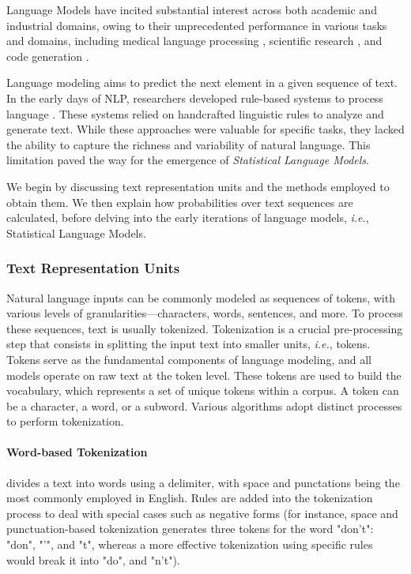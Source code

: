 Language Models have incited substantial interest across both academic and industrial domains, owing to their unprecedented performance in various tasks and domains, including medical language processing \citep{thirunavukarasu2023large}, scientific research \citep{wang2023scientific}, and code generation \citep{xu2022systematic}.

Language modeling aims to predict the next element in a given sequence of text. In the early days of \ac{NLP}, researchers developed rule-based systems to process language \citep{manning1999foundations}. These systems relied on handcrafted linguistic rules to analyze and generate text. While these approaches were valuable for specific tasks, they lacked the ability to capture the richness and variability of natural language. This limitation paved the way for the emergence of \textit{Statistical Language Models}. 

We begin by discussing text representation units and the methods employed to obtain them. We then explain how probabilities over text sequences are calculated, before delving into the early iterations of language models, \textit{i.e.}, Statistical Language Models.

\subsubsection{Text Representation Units}

Natural language inputs can be commonly modeled as sequences of tokens, with various levels of granularities—characters, words, sentences, and more. To process these sequences, text is usually tokenized. Tokenization is a crucial pre-processing step that consists in splitting the input text into smaller units, \textit{i.e.}, tokens. Tokens serve as the fundamental components of language modeling, and all models operate on raw text at the token level. These tokens are used to build the vocabulary, which represents a set of unique tokens within a corpus. A token can be a character, a word, or a subword. Various algorithms adopt distinct processes to perform tokenization. 

\paragraph{Word-based Tokenization} divides a text into words using a delimiter, with space and punctations being the most commonly employed in English. Rules are added into the tokenization process to deal with special cases such as negative forms (for instance, space and punctuation-based tokenization generates three tokens for the word "don't":  "don", "'", and "t", whereas a more effective tokenization using specific rules would  break it into "do", and "n't").

